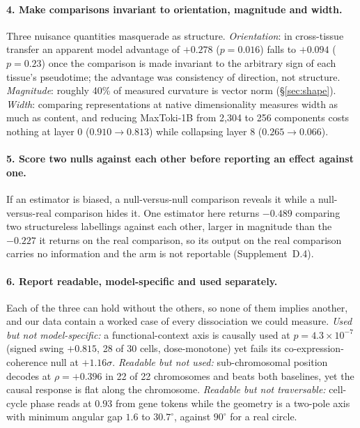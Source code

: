 \documentclass[11pt]{article}
\begin{document}
\paragraph{4. Make comparisons invariant to orientation, magnitude and width.} Three nuisance
quantities masquerade as structure. \emph{Orientation}: in cross-tissue transfer an apparent model
advantage of $+0.278$ ($p=0.016$) falls to $+0.094$ ($p=0.23$) once the comparison is made invariant to
the arbitrary sign of each tissue's pseudotime; the advantage was consistency of direction, not
structure. \emph{Magnitude}: roughly 40\% of measured curvature is vector norm (\S\ref{sec:shape}).
\emph{Width}: comparing representations at native dimensionality measures width as much as content, and
reducing MaxToki-1B from 2{,}304 to 256 components costs nothing at layer 0 ($0.910 \to 0.813$) while
collapsing layer 8 ($0.265 \to 0.066$).

\paragraph{5. Score two nulls against each other before reporting an effect against one.} If an
estimator is biased, a null-versus-null comparison reveals it while a null-versus-real comparison hides
it. One estimator here returns $-0.489$ comparing two structureless labellings against each other,
larger in magnitude than the $-0.227$ it returns on the real comparison, so its output on the real
comparison carries no information and the arm is not reportable (Supplement~D.4).

\paragraph{6. Report readable, model-specific and used separately.} Each of the three can hold without
the others, so none of them implies another, and our data contain a worked case of every dissociation
we could measure. \emph{Used but not model-specific:} a
functional-context axis is causally used at $p=4.3\times10^{-7}$ (signed swing $+0.815$, 28 of 30
cells, dose-monotone) yet fails its co-expression-coherence null at $+1.16\sigma$. \emph{Readable but
not used:} sub-chromosomal position decodes at $\rho=+0.396$ in 22 of 22 chromosomes and beats both
baselines, yet the causal response is flat along the chromosome. \emph{Readable but not traversable:}
cell-cycle phase reads at $0.93$ from gene tokens while the geometry is a two-pole axis with minimum
angular gap $1.6$ to $30.7^\circ$, against $90^\circ$ for a real circle.
\end{document}
